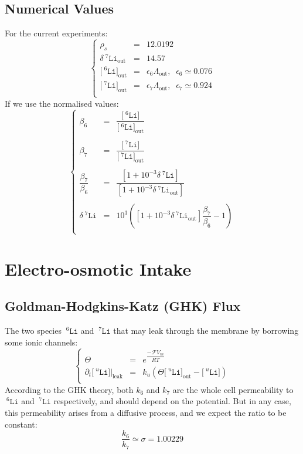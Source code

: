 \documentclass[aps,onecolumn,11pt]{revtex4}
\newcommand{\mychem}[1]{\mathtt{#1}}
\newcommand{\myconc}[1]{\big[#1\big]}
\newcommand{\Faraday}{\mathcal{F}}
\newcommand{\spLi}[1]{{\!~^{#1}\mychem{Li}}}
\newcommand{\Li}[1]{\myconc{\spLi{#1}}}
\newcommand{\deltaLi}{\delta\!\!\spLi{7}}
\newcommand{\myleak}[1]{\left.{#1}\right\vert_{\mathrm{leak}}}
\newcommand{\myout}[1]{{#1}_{\mathrm{out}}}
\newcommand{\LiOut}[1]{\myout{\Li{#1}}}
\newcommand{\LiAll}{\Lambda}
\newcommand{\LiAllOut}{\myout{\LiAll}}
\newcommand{\deltaLiOut}{\myout{\deltaLi}}
\begin{document}
\subsection{Numerical Values}
For the current experiments:
\begin{equation}
\left\lbrace
\begin{array}{rcl}
	\rho_s   & = & 12.0192\\
	\deltaLiOut & = & 14.57\\
	\LiOut{6}   & = & \epsilon_6 \LiAllOut, \;\;\epsilon_6\simeq 0.076\\
	\LiOut{7}   & = & \epsilon_7 \LiAllOut, \;\;\epsilon_7\simeq 0.924\\
\end{array}
\right. 
\end{equation}
If we use the normalised values:
\begin{equation}
\label{eq:beta}
\left\lbrace
\begin{array}{rcl}
	\beta_6 & = & \dfrac{\Li{6}}{\LiOut{6}}\\
	\\
	\beta_7 & = & \dfrac{\Li{7}}{\LiOut{7}}\\
	\\
	\dfrac{\beta_7}{\beta_6} & = & \dfrac{\left[1+10^{-3}\deltaLi\right]}{\left[1+10^{-3}\deltaLiOut\right]}\\
	\\
	\deltaLi & = & 10^3 \left( \left[1+10^{-3}\deltaLiOut\right]\dfrac{\beta_7}{\beta_6} -1 \right)\\
\end{array}
\right.
\end{equation}


\section{Electro-osmotic Intake}
\subsection{Goldman-Hodgkins-Katz (GHK) Flux}
The two species $\spLi{6}$ and $\spLi{7}$ that may leak through the membrane by borrowing some ionic channels:
\begin{equation}
\left\lbrace
\begin{array}{rcl}
	\Theta    & = & e^{\dfrac{-\Faraday V_m }{RT}} \\
	\partial_t \myleak{\Li{u}} & = & k_u \left( \Theta \LiOut{u} - \Li{u}\right)\\
\end{array}
\right.
\end{equation}
According to the GHK theory, both $k_6$ and $k_7$ are the whole cell permeability to $\spLi{6}$ and $\spLi{7}$ respectively,
and should depend on the potential. But in any case, this permeability arises from a diffusive process, and we expect the ratio to be constant:
\begin{equation}
\label{eq:sigma}
	\dfrac{k_6}{k_7} \simeq \sigma = 1.00229
\end{equation}
\end{document}
